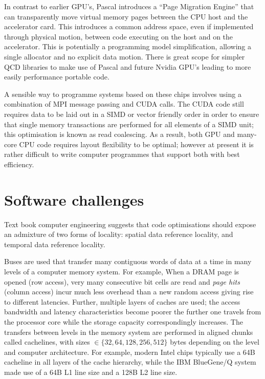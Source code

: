 \documentclass{PoS}
\begin{document}
In contrast to earlier GPU's, Pascal introduces a ``Page Migration Engine'' that can
transparently move virtual memory pages between the CPU host and the accelerator card.
This introduces a common address space, even if implemented through physical motion, between code
executing on the host and on the accelerator. This is potentially a programming model simplification, allowing
a single allocator and no explicit data motion. There is great scope for simpler QCD libraries
to make use of Pascal and future Nvidia GPU's leading to more easily performance portable code.

A sensible way to programme systems based on these chips involves using a combination of MPI message passing and CUDA calls.
The CUDA code still requires data to be laid out in a SIMD or vector friendly order in order to ensure that
single memory transactions are performed for all elements of a SIMD unit; this optimisation is known as read coalescing.
As a result, both GPU and many-core CPU code requires layout flexibility to be optimal; however at present it is rather
difficult to write computer programmes that support both with best efficiency.

\section{Software challenges}

Text book computer engineering\cite{HennessyPatterson} suggests that code optimisations should
expose an admixture of two forms of locality: spatial data reference locality, and temporal data reference locality.

Buses are used that transfer many contiguous words of data at a time in many levels of a computer memory system.
For example, When a DRAM page is opened (row access), very many consecutive bit cells are read and \emph{page hits} (column access) incur much less 
overhead than a new random access giving rise to different latencies. Further, multiple layers of caches are used; the access bandwidth and latency
characteristics become poorer the further one travels from the processor core while the storage capacity correspondingly increases.
The transfers between levels in the memory system are performed in aligned chunks called cachelines, with sizes $\in\{32,64,128,256,512\}$ bytes
depending on the level and computer architecture. For example, modern Intel chips typically use a 64B cacheline in all layers of the cache hierarchy, while
the IBM BlueGene/Q system made use of a 64B L1 line size and a 128B L2 line size.
\end{document}
